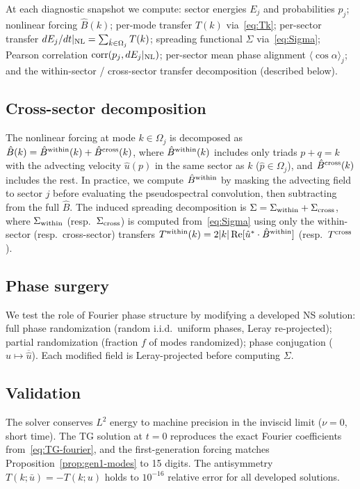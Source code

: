 \documentclass[11pt]{article}
\theoremstyle{definition}
\DeclareMathOperator{\re}{Re}
\DeclareMathOperator{\corr}{corr}
\begin{document}
At each diagnostic snapshot we compute: sector energies
$E_j$ and probabilities $p_j$; nonlinear forcing
$\hat B(k)$; per-mode transfer $T(k)$ via~\eqref{eq:Tk};
per-sector transfer $dE_j/dt|_{\rm NL}
=\sum_{\hat k\in\Omega_j}T(k)$;
spreading functional $\Sigma$ via~\eqref{eq:Sigma};
Pearson correlation $\corr(p_j, dE_j|_{\rm NL})$;
per-sector mean phase alignment
$\langle\cos\alpha\rangle_j$; and the within-sector /
cross-sector transfer decomposition (described below).

\subsection{Cross-sector decomposition}

The nonlinear forcing at mode $k\in\Omega_j$ is
decomposed as $\hat B(k) = \hat B^{\rm within}(k)
+ \hat B^{\rm cross}(k)$, where
$\hat B^{\rm within}(k)$ includes only triads $p+q=k$
with the advecting velocity $\hat u(p)$ in the same
sector as $k$ ($\hat p\in\Omega_j$), and
$\hat B^{\rm cross}(k)$ includes the rest.  In
practice, we compute $\hat B^{\rm within}$ by masking
the advecting field to sector $j$ before evaluating
the pseudospectral convolution, then subtracting from
the full $\hat B$.  The induced spreading decomposition
is $\Sigma = \Sigma_{\rm within}+\Sigma_{\rm cross}$,
where $\Sigma_{\rm within}$ (resp.\ $\Sigma_{\rm cross}$)
is computed from~\eqref{eq:Sigma} using only the
within-sector (resp.\ cross-sector) transfers
$T^{\rm within}(k) = 2|k|\re[\hat u^*\cdot
\hat B^{\rm within}]$ (resp.\ $T^{\rm cross}$).

\subsection{Phase surgery}

We test the role of Fourier phase structure by modifying
a developed NS solution:
full phase randomization (random i.i.d.\ uniform
phases, Leray re-projected);
partial randomization (fraction $f$ of modes
randomized);
phase conjugation ($\hat u\mapsto\overline{\hat u}$).
Each modified field is Leray-projected before computing
$\Sigma$.

\subsection{Validation}

The solver conserves $L^2$ energy to machine precision
in the inviscid limit ($\nu=0$, short time).  The TG
solution at $t=0$ reproduces the exact Fourier coefficients
from~\eqref{eq:TG-fourier}, and the first-generation
forcing matches Proposition~\ref{prop:gen1-modes} to 15
digits.  The antisymmetry $T(k;\bar u)=-T(k;u)$ holds to
$10^{-16}$ relative error for all developed solutions.
\end{document}
